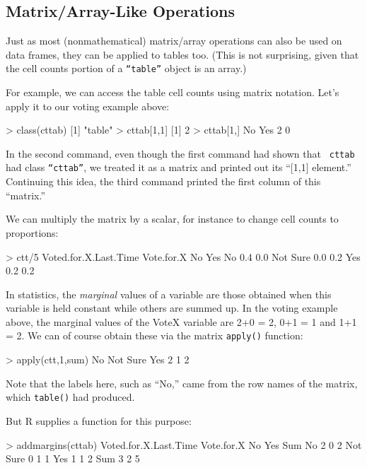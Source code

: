 \subsection{Matrix/Array-Like Operations}

Just as most (nonmathematical) matrix/array operations can also be used on
data frames, they can be applied to tables too.  (This is not
surprising, given that the cell counts portion of a {\tt ``table''} object is
an array.)

For example, we can access the table cell counts using matrix notation.
Let's apply it to our voting example above:

\begin{Code}
> class(cttab)
[1] "table"
> cttab[1,1]
[1] 2
> cttab[1,]
 No Yes 
  2   0 
\end{Code}

\noindent
In the second command, even though the first command had shown that {\tt
cttab} had class {\tt ``cttab''}, we treated it as a matrix and printed
out its ``[1,1] element.''  Continuing this idea, the third command
printed the first column of this ``matrix.''

We can multiply the matrix by a scalar, for instance to change cell counts to
proportions:

\begin{Code}
> ctt/5
          Voted.for.X.Last.Time
Vote.for.X  No Yes
  No       0.4 0.0
  Not Sure 0.0 0.2
  Yes      0.2 0.2
\end{Code}

In statistics, the {\it marginal} values of a variable are those
obtained when this variable is held constant while others are summed up.
In the voting example above, the marginal values of the VoteX variable
are 2+0 = 2, 0+1 = 1 and 1+1 = 2.  We can of course obtain these via the
matrix {\tt apply()} function:

\begin{Code}
> apply(ctt,1,sum)
      No Not Sure      Yes 
       2        1        2 
\end{Code}

\noindent
Note that the labels here, such as ``No,'' came from the row names of
the matrix, which {\tt table()} had produced.

But R supplies a function for this purpose:

\begin{Code}
> addmargins(cttab)
          Voted.for.X.Last.Time
Vote.for.X No Yes Sum
  No        2   0   2
  Not Sure  0   1   1
  Yes       1   1   2
  Sum       3   2   5
\end{Code}

